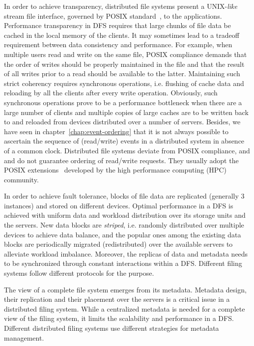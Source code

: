 In order to achieve transparency, distributed file systems present a UNIX-{\it like} stream file interface, governed by POSIX
standard~\citep{IEEE-POSIX}, to the applications. Performance transparency in DFS requires that large chunks of file data be 
cached in the local memory of the clients. It may sometimes lead to a tradeoff requirement between data consistency and performance. 
For example, when multiple users read and write on the same file, POSIX compliance demands that the order of writes should be 
properly maintained in the file and that the result of all writes prior to a read should be available to the latter. Maintaining 
such strict coherency requires synchronous operations, i.e. flushing of cache data and reloading by all the clients after every 
write operation. Obviously, such synchronous operations prove to be a performance bottleneck when there are a large number of 
clients and multiple copies of large caches are to be written back to and reloaded from devices distributed over a number of servers. 
Besides, we have seen in chapter~\ref{chap:event-ordering} that it is not always possible to ascertain the sequence of (read/write) 
events in a distributed system in absence of a common clock. Distributed file systems deviate from POSIX compliance, and 
and do not guarantee ordering of read/write requests. They usually adopt the POSIX extensions~\citep{Welch:2005} developed
by the high performance computing (HPC) community.

In order to achieve fault tolerance, blocks of file data are replicated (generally 3 instances) and stored on different devices. 
Optimal performance in a DFS is achieved with uniform data and workload distribution over its storage units and the servers. 
New data blocks are {\em striped}, i.e. randomly distributed over multiple devices to achieve data balance, and the popular ones 
among the existing data blocks are periodically migrated (redistributed) over the available servers to alleviate workload imbalance.
%
Moreover, the replicas of data and metadata needs to be synchronized through constant interactions within a DFS. Different filing
systems follow different protocols for the purpose.

The view of a complete file system emerges from its metadata. Metadata design, their replication and their placement over the
servers is a critical issue in a distributed filing system. While a centralized metadata is needed for a complete view of the
filing system, it limits the scalability and performance in a DFS. Different distributed filing systems use different strategies 
for metadata management.

